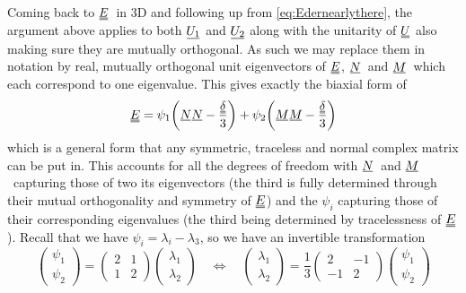 \documentclass[12pt]{article}
\newcommand{\suf}[2]{\stackunder[0.5pt]{\stackunder[1pt]{\ensuremath{#1}}{\rule{\widthof{\ensuremath{#2}}*\real{0.9}}{.1ex}}}{}}
\newcommand{\duf}[2]{\stackunder[0.5pt]{\stackunder[0.8pt]{\stackunder[1pt]{\ensuremath{#1}}{\rule{\widthof{\ensuremath{#2}}*\real{0.9}}{.1ex}}}{\rule{\widthof{\ensuremath{#2}}*\real{0.9}}{.1ex}}}{}}
\newcommand{\su}[1]{\suf{#1}{#1}}
\newcommand{\du}[1]{\duf{#1}{#1}}
\newcommand{\NN}{\ensuremath{\su{N}}}
\newcommand{\MM}{\ensuremath{\su{M}}}
\newcommand{\EE}{\ensuremath{\du{E}}}
\newcommand{\dudelta}{\ensuremath{\du{\delta}}}
\begin{document}
        Coming back to \EE\ in 3D and following up from \cref{eq:Edernearlythere}, the argument above applies to both $\su{U_1}$ and $\su{U_2}$ along with the unitarity of $\du{U}$ also making sure they are mutually orthogonal.
        As such we may replace them in notation by real, mutually orthogonal unit eigenvectors of \EE, \NN\ and \MM\ which each correspond to one eigenvalue.
        This gives exactly the biaxial form of
        \begin{equation}\label{eq:Ebiax}
            \du{E} = \psi_1 \qty(\NN\NN - \frac{\dudelta}{3}) + \psi_2 \qty(\MM\MM - \frac{\dudelta}{3})
        \end{equation}
        which is a general form that any symmetric, traceless and normal complex matrix can be put in.
        This accounts for all the degrees of freedom with \NN\ and \MM\ capturing those of two its eigenvectors (the third is fully determined through their mutual orthogonality and symmetry of \EE) and the $\psi_i$ capturing those of their corresponding eigenvalues (the third being determined by tracelessness of \EE).
        Recall that we have $\psi_i = \lambda_i - \lambda_3$, so we have an invertible transformation
        \begin{equation}
            \begin{pmatrix} \psi_1 \\ \psi_2 \end{pmatrix} = \begin{pmatrix} 2 & 1 \\ 1 & 2 \end{pmatrix} \begin{pmatrix} \lambda_1 \\ \lambda_2 \end{pmatrix}
            \quad\Leftrightarrow\quad
            \begin{pmatrix} \lambda_1 \\ \lambda_2 \end{pmatrix} = \frac{1}{3}\begin{pmatrix} 2 & -1 \\ -1 & 2 \end{pmatrix} \begin{pmatrix} \psi_1 \\ \psi_2 \end{pmatrix}
        \end{equation}
\end{document}
